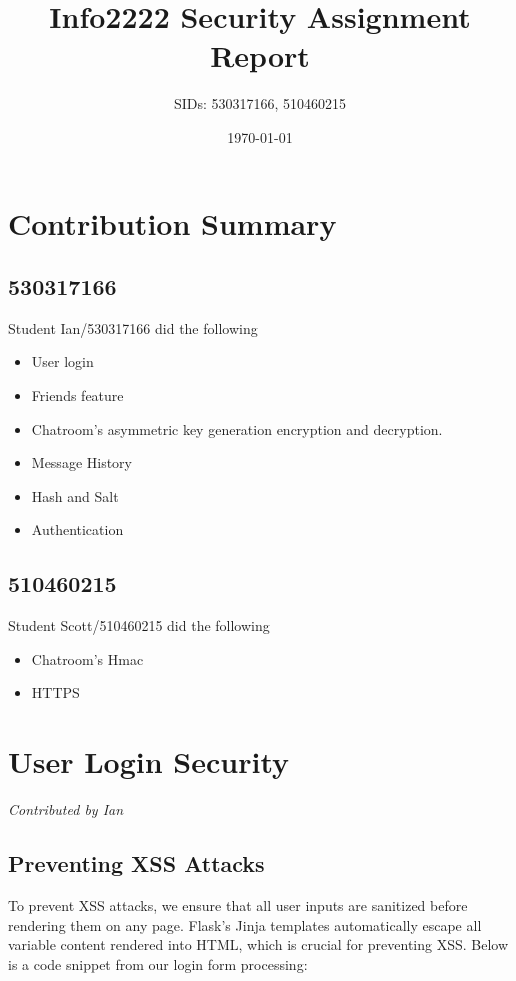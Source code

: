 \documentclass{article}
\title{Info2222 Security Assignment Report}
\author{SIDs: 530317166, 510460215}
\date{\today}
\begin{document}
\maketitle

\section*{Contribution Summary}

\subsection*{530317166}
Student Ian/530317166 did the following
\begin{itemize}
    \item User login
    \item Friends feature
    \item Chatroom's asymmetric key generation encryption and decryption. 
    \item Message History 
    \item Hash and Salt
    \item Authentication
\end{itemize}

\subsection*{510460215}
Student Scott/510460215 did the following
\begin{itemize}
    \item Chatroom's Hmac 
    \item HTTPS
\end{itemize}

\section{User Login Security}
\textit{Contributed by Ian}

\subsection{Preventing XSS Attacks}
To prevent XSS attacks, we ensure that all user inputs are sanitized before rendering them on any page. Flask’s Jinja templates automatically escape all variable content rendered into HTML, which is crucial for preventing XSS. Below is a code snippet from our login form processing:
\end{document}
